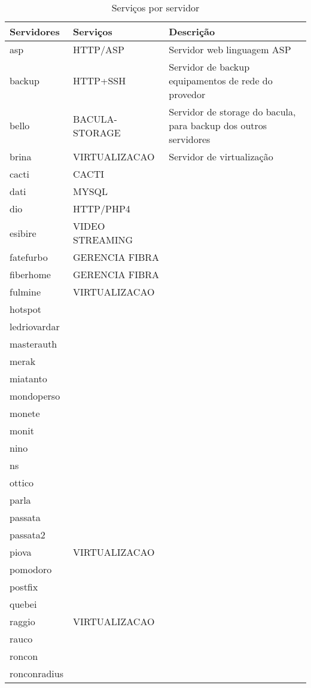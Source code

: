 \begin{table}
\caption {Serviços por servidor}
\label{tab:servporservidor}
\begin{center}
\begin{tabular}[]{|l|l|l|}\hline
Servidores & Serviços & Descrição\\\hline
asp & HTTP/ASP & Servidor web linguagem ASP\\\hline
backup & HTTP+SSH & Servidor de backup equipamentos de rede do provedor\\\hline
bello & BACULA-STORAGE & Servidor de storage do bacula, para backup dos outros servidores\\\hline
brina & VIRTUALIZACAO & Servidor de virtualização\\\hline
cacti & CACTI & \\\hline
dati & MYSQL & \\\hline
dio & HTTP/PHP4 & \\\hline
esibire & VIDEO STREAMING & \\\hline
fatefurbo & GERENCIA FIBRA & \\\hline
fiberhome & GERENCIA FIBRA & \\\hline
fulmine & VIRTUALIZACAO & \\\hline
hotspot &  & \\\hline
ledriovardar &  & \\\hline
masterauth &  & \\\hline
merak &  & \\\hline
miatanto &  & \\\hline
mondoperso &  & \\\hline
monete &  & \\\hline
monit &  & \\\hline
nino &  & \\\hline
ns &  & \\\hline
ottico &  & \\\hline
parla &  & \\\hline
passata &  & \\\hline
passata2 &  & \\\hline
piova & VIRTUALIZACAO & \\\hline
pomodoro &  & \\\hline
postfix &  & \\\hline
quebei &  & \\\hline
raggio & VIRTUALIZACAO & \\\hline
rauco &  & \\\hline
roncon &  & \\\hline
ronconradius &  & \\\hline

\end{tabular}
\end{center}
\end{table}
